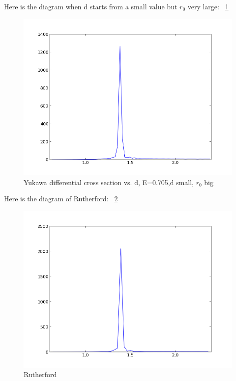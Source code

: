 \documentclass[11pt,letterpaper]{article}
\begin{document}
Here is the diagram when d starts from a small value but $r_0$ very large: ~\ref{figure16}

\begin{figure}
\begin{center}
\includegraphics[width=0.9\linewidth,angle=0]{r0big.png}
\caption{Yukawa differential cross section vs. d, E=0.705,d small, $r_0$ big}
\label{figure16}
\end{center}
\end{figure}


Here is the diagram of Rutherford: ~\ref{figure15}

\begin{figure}
\begin{center}
\includegraphics[width=0.9\linewidth,angle=0]{r.png}
\caption{Rutherford}
\label{figure15}
\end{center}
\end{figure}
\end{document}

